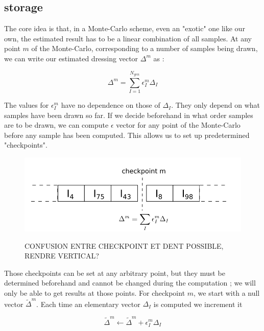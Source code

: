 \documentclass[./thesis.tex]{subfiles}
\begin{document}
\subsection{storage}

The core idea is that, in a Monte-Carlo scheme, even an "exotic" one like our own, the estimated result has to be a linear combination of all samples. At any point $m$ of the Monte-Carlo, corresponding to a number of samples being drawn, we can write our estimated dressing vector $\Delta^m$ as :


\begin{equation}
\Delta^m = \sum_{I=1}^{N_{gen}} \epsilon^m_{I} \Delta_I
\end{equation}


The values for $\epsilon^m_I$ have no dependence on those of $\Delta_I$. They only depend on what samples have been drawn so far. If we decide beforehand in what order samples are to be drawn, we can compute $\epsilon$ vector for any point of the Monte-Carlo before any sample has been computed. This allows us to set up predetermined "checkpoints".

\begin{figure}[h!]
	\begin{center}
		\includegraphics[width=1.00\columnwidth]{figures/matrix_dressing/checkpoint}
		\caption{\label{checkpoint}}
		CONFUSION ENTRE CHECKPOINT ET DENT POSSIBLE, RENDRE VERTICAL?
	\end{center}
\end{figure}


Those checkpoints can be set at any arbitrary point, but they must be determined beforehand and cannot be changed during the computation ; we will only be able to get results at those points.
For checkpoint $m$, we start with a null vector $\tilde \Delta^m$. Each time an elementary vector $\Delta_I$ is computed
we increment it 



\begin{equation}
\tilde \Delta^m \gets \tilde \Delta^m + \epsilon_I^m \Delta_I
\end{equation}
\end{document}
